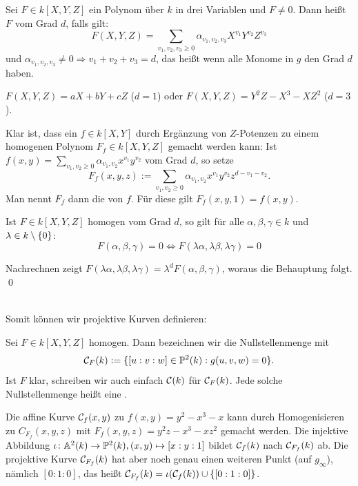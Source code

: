 \begin{defn}
	Sei $F \in k[X,Y,Z]$ ein Polynom über $k$ in drei Variablen und $F \neq 0$. Dann heißt $F$  vom Grad $d$, falls gilt:
	\[ F(X,Y,Z) = \sum_{v_1,v_2,v_3 \geq 0} \alpha_{v_1,v_2,v_3} X^{v_1} Y^{v_2} Z^{v_3} \]
	und $\alpha_{v_1,v_2,v_3} \neq 0 \Rightarrow v_1 + v_2 + v_3 = d$, das heißt wenn alle Monome in $g$ den Grad $d$ haben.
\end{defn}

\begin{bsp}
	$F(X,Y,Z) = aX + bY + cZ$ ($d=1$) oder $F(X,Y,Z) = Y^2Z-X^3-XZ^2$ ($d=3$).
\end{bsp}

\begin{bem}
	Klar ist, dass ein $f \in k[X,Y]$ durch Ergänzung von $Z$-Potenzen zu einem homogenen Polynom $F_f \in k[X,Y,Z]$ gemacht werden kann: Ist $f(x,y) = \sum_{v_1,v_2 \geq 0} \alpha_{v_1,v_2} x^{v_1} y^{v_2}$ vom Grad $d$, so setze 
	\[ F_f(x,y,z) := \sum_{v_1,v_2 \geq 0} \alpha_{v_1,v_2} x^{v_1} y^{v_2} z^{d-v_1-v_2}.\] Man nennt $F_f$ dann die  von $f$. Für diese gilt $F_f(x,y,1) = f(x,y)$.
\end{bem}

\begin{lemma}
	Ist $F \in k[X,Y,Z]$ homogen vom Grad $d$, so gilt für alle $\alpha, \beta, \gamma \in k$ und $\lambda \in k \setminus \{0\}$:
	\[ F(\alpha,\beta,\gamma) = 0 \Leftrightarrow F(\lambda \alpha, \lambda \beta, \lambda \gamma) = 0\]
\end{lemma}

	Nachrechnen zeigt $F(\lambda \alpha, \lambda \beta, \lambda \gamma) = \lambda^d F(\alpha, \beta, \gamma)$, woraus die Behauptung folgt. \qed

\mbox{}\\	
Somit können wir projektive Kurven definieren:
\begin{defn}
	Sei $F \in k[X,Y,Z]$ homogen. Dann bezeichnen wir die Nullstellenmenge mit
	\[ \mathcal{C}_F(k) := \{[u:v:w] \in \mathbb{P}^2(k) : g(u,v,w) = 0\}.\]
	Ist $F$ klar, schreiben wir auch einfach $\mathcal{C}(k)$ für $\mathcal{C}_F(k)$. Jede solche Nullstellenmenge heißt eine .
\end{defn}

\begin{bsp}
	Die affine Kurve $\mathcal{C}_f(x,y)$ zu $f(x,y) = y^2-x^3-x$ kann durch Homogenisieren zu $C_{F_f}(x,y,z)$ mit $F_f(x,y,z) = y^2z-x^3-xz^2$ gemacht werden. Die injektive Abbildung $\iota\colon \mathbb{A}^2(k) \rightarrow \mathbb{P}^2(k), (x,y) \mapsto [x:y:1]$ bildet $\mathcal{C}_f(k)$ nach $\mathcal{C}_{F_f}(k)$ ab. Die projektive Kurve $\mathcal{C}_{F_f}(k)$ hat aber noch genau einen weiteren Punkt (auf $g_\infty$), nämlich $[0:1:0]$, das heißt $\mathcal{C}_{F_f}(k) = \iota(\mathcal{C}_f(k)) \cup \{[0:1:0]\}$.
\end{bsp}

